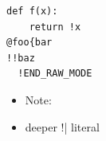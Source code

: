 \begin{lstlisting}
def f(x):
	return !x
@foo{bar
!!baz
  !END_RAW_MODE
\end{lstlisting}

\begin{itemize}
\item Note:
    \item	deeper
!| literal
\end{itemize}

